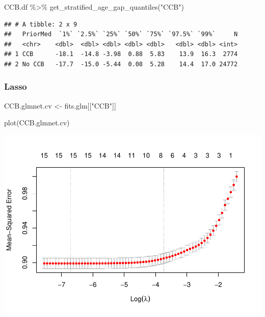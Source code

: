 \documentclass[
]{article}
\newenvironment{Shaded}{\begin{snugshade}}{\end{snugshade}}
\newcommand{\FunctionTok}[1]{\textcolor[rgb]{0.00,0.00,0.00}{#1}}
\newcommand{\NormalTok}[1]{#1}
\newcommand{\OtherTok}[1]{\textcolor[rgb]{0.56,0.35,0.01}{#1}}
\newcommand{\SpecialCharTok}[1]{\textcolor[rgb]{0.00,0.00,0.00}{#1}}
\newcommand{\StringTok}[1]{\textcolor[rgb]{0.31,0.60,0.02}{#1}}
\begin{document}
\begin{Shaded}
\begin{Highlighting}[]
\NormalTok{CCB.df }\SpecialCharTok{\%\textgreater{}\%} 
  \FunctionTok{get\_stratified\_age\_gap\_quantiles}\NormalTok{(}\StringTok{"CCB"}\NormalTok{)}
\end{Highlighting}
\end{Shaded}

\begin{verbatim}
## # A tibble: 2 x 9
##   PriorMed  `1%` `2.5%` `25%` `50%` `75%` `97.5%` `99%`     N
##   <chr>    <dbl>  <dbl> <dbl> <dbl> <dbl>   <dbl> <dbl> <int>
## 1 CCB      -18.1  -14.8 -3.98  0.88  5.83    13.9  16.3  2774
## 2 No CCB   -17.7  -15.0 -5.44  0.08  5.28    14.4  17.0 24772
\end{verbatim}

\hypertarget{lasso-6}{%
\subsubsection{Lasso}\label{lasso-6}}

\begin{Shaded}
\begin{Highlighting}[]
\NormalTok{CCB.glmnet.cv }\OtherTok{\textless{}{-}}\NormalTok{ fits.glm[[}\StringTok{"CCB"}\NormalTok{]]}
\end{Highlighting}
\end{Shaded}

\begin{Shaded}
\begin{Highlighting}[]
\FunctionTok{plot}\NormalTok{(CCB.glmnet.cv) }
\end{Highlighting}
\end{Shaded}

\includegraphics{../results/report_files/figure-latex/CCB-lasso-plot-1.pdf}
\end{document}
